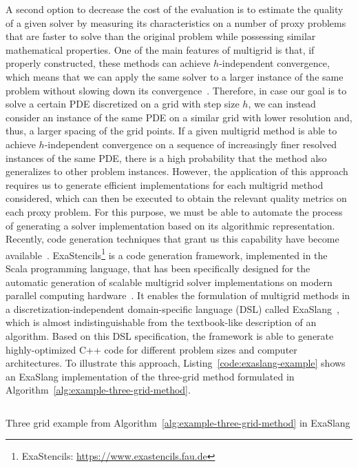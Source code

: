 A second option to decrease the cost of the evaluation is to estimate the quality of a given solver by measuring its characteristics on a number of proxy problems that are faster to solve than the original problem while possessing similar mathematical properties.
One of the main features of multigrid is that, if properly constructed, these methods can achieve $h$-independent convergence, which means that we can apply the same solver to a larger instance of the same problem without slowing down its convergence~\cite{trottenberg2000multigrid}.
Therefore, in case our goal is to solve a certain PDE discretized on a grid with step size $h$, we can instead consider an instance of the same PDE on a similar grid with lower resolution and, thus, a larger spacing of the grid points.
If a given multigrid method is able to achieve $h$-independent convergence on a sequence of increasingly finer resolved instances of the same PDE, there is a high probability that the method also generalizes to other problem instances.
However, the application of this approach requires us to generate efficient implementations for each multigrid method considered, which can then be executed to obtain the relevant quality metrics on each proxy problem.
For this purpose, we must be able to automate the process of generating a solver implementation based on its algorithmic representation.
Recently, code generation techniques that grant us this capability have become available~\cite{kostler2020code,schmitt2018automating}.
ExaStencils\footnote{ExaStencils: \url{https://www.exastencils.fau.de}} is a code generation framework, implemented in the Scala programming language, that has been specifically designed for the automatic generation of scalable multigrid solver implementations on modern parallel computing hardware~\cite{lengauer2014exastencils,lengauer2020exastencils}.
It enables the formulation of multigrid methods in a discretization-independent domain-specific language (DSL) called ExaSlang~\cite{schmitt2014exaslang,schmitt2016systems}, which is almost indistinguishable from the textbook-like description of an algorithm.
Based on this DSL specification, the framework is able to generate highly-optimized C++ code for different problem sizes and computer architectures.
To illustrate this approach, Listing~\ref{code:exaslang-example} shows an ExaSlang implementation of the three-grid method formulated in Algorithm~\ref{alg:example-three-grid-method}.
\begin{listing}
	\inputminted[fontsize=\footnotesize,breaklines]{scala}{evostencils/code_generation/three_grid_example.exa3}
	\caption{Three grid example from Algorithm~\ref{alg:example-three-grid-method} in ExaSlang}
	\label{code:exaslang-example}
\end{listing}
